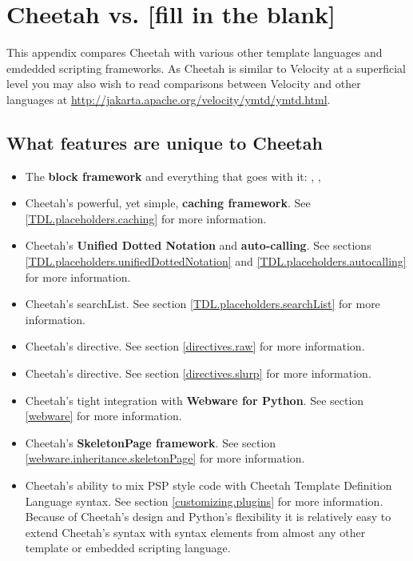 \section{Cheetah vs. [fill in the blank]}
\label{comparisons}

This appendix compares Cheetah with various other template languages and
emdedded scripting frameworks.  As Cheetah is similar to Velocity at a
superficial level you may also wish to read comparisons between Velocity and
other languages at \url{http://jakarta.apache.org/velocity/ymtd/ymtd.html}.

\subsection{What features are unique to Cheetah}
\label{comparisons.unique}

\begin{itemize}
\item The {\bf block framework} and everything that goes with it: ,
     , 
\item Cheetah's powerful, yet simple, {\bf caching framework}. See
     \ref{TDL.placeholders.caching} for more information.
\item Cheetah's {\bf Unified Dotted Notation} and {\bf auto-calling}. See
     sections \ref{TDL.placeholders.unifiedDottedNotation} and
     \ref{TDL.placeholders.autocalling} for more information.
\item Cheetah's searchList. See section \ref{TDL.placeholders.searchList} for more
     information.
\item Cheetah's  directive.  See section \ref{directives.raw} for more
     information.
\item Cheetah's  directive.  See section \ref{directives.slurp} for more
     information.
\item Cheetah's tight integration with {\bf Webware for Python}.  See section
     \ref{webware} for more information.
\item Cheetah's {\bf SkeletonPage framework}.  See section
     \ref{webware.inheritance.skeletonPage} for more information.
\item Cheetah's ability to mix PSP style code with Cheetah Template Definition
     Language syntax.  See section \ref{customizing.plugins} for more
     information.  Because of Cheetah's design and Python's flexibility it is
     relatively easy to extend Cheetah's syntax with syntax elements from almost
     any other template or embedded scripting language.
\end{itemize}

